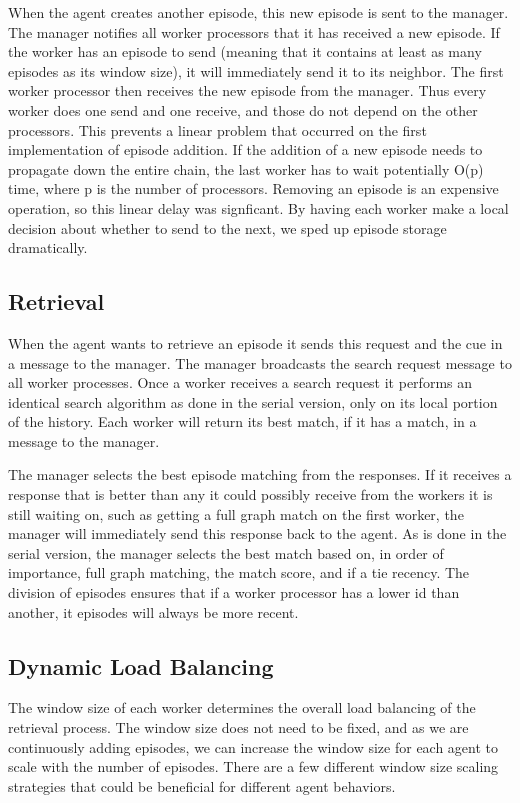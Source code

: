 \documentclass[11pt]{article} %
\begin{document}
When the agent creates another episode, this new episode is sent to the
manager. The manager notifies all worker processors that it has received a new
episode. If the worker has an episode to send (meaning that it contains at least
as many episodes as its window size), it will immediately send it to its neighbor. 
The first worker processor then receives the new episode from the manager. 
Thus every worker does one send and one receive, and those do not depend
on the other processors. This prevents a linear problem that occurred on the
first implementation of episode addition. If the addition of a new episode needs
to propagate down the entire chain, the last worker has to wait potentially O(p) time, 
where p is the number of processors. Removing an episode is an expensive operation, 
so this linear delay was signficant. By having each worker make a local decision
about whether to send to the next, we sped up episode storage dramatically. 


\subsection{Retrieval}
When the agent wants to retrieve an episode it sends this request and the cue in
a message to the manager. The manager broadcasts the search request message to
all worker processes. Once a worker receives a search request it performs an
identical search algorithm as done in the serial version, only on its local portion
of the history. Each worker will return its best match, if it
has a match, in a message to the manager.

The manager selects the best episode matching from the responses. If it receives
a response that is better than any it could possibly receive from the workers it
is still waiting on, such as getting a full graph match on the first worker, the
manager will immediately send this response back to the agent. As is done in the
serial version, the manager selects the best match based on, in order of
importance, full graph matching, the match score, and if a tie recency. The
division of episodes ensures that if a worker processor has a lower id than
another, it episodes will always be more recent.

\subsection{Dynamic Load Balancing}

The window size of each worker determines the overall load balancing of the
retrieval process. The window size does not need to be fixed, and as we are
continuously adding episodes, we can increase the window size for each agent to
scale with the number of episodes. There are a few different window size scaling
strategies that could be beneficial for different agent behaviors.
\end{document}
